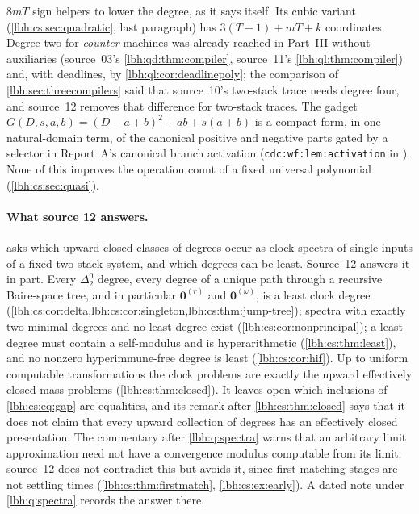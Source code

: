 \documentclass[11pt,letterpaper]{article}
\theoremstyle{definition}
\theoremstyle{remark}
\newcommand{\1}{\mathbf 1}
\begin{document}
$8mT$ sign helpers to lower the degree, as it says itself. Its cubic variant
(\cref{lbh:cs:sec:quadratic}, last paragraph) has $3(T+1)+mT+k$ coordinates. Degree two for
\emph{counter} machines was already reached in Part~III without auxiliaries (source~03's
\cref{lbh:qd:thm:compiler}, source~11's \cref{lbh:ql:thm:compiler}) and, with deadlines, by
\cref{lbh:ql:cor:deadlinepoly}; the comparison of \cref{lbh:sec:threecompilers} said that source~10's
two-stack trace needs degree four, and source~12 removes that difference for two-stack traces. The
gadget $G(D,s,a,b)=(D-a+b)^2+ab+s(a+b)$ is a compact form, in one natural-domain term, of the
canonical positive and negative parts gated by a selector in Report~A's canonical branch activation
(\texttt{cdc:wf:lem:activation} in ). None of this improves
the operation count of a fixed universal polynomial (\cref{lbh:cs:sec:quasi}).

\paragraph{What source 12 answers.}  asks which upward-closed classes of
degrees occur as clock spectra of single inputs of a fixed two-stack system, and which degrees can
be least. Source~12 answers it in part. Every $\Delta^0_2$ degree, every degree of a unique path
through a recursive Baire-space tree, and in particular $\mathbf0^{(r)}$ and $\mathbf0^{(\omega)}$,
is a least clock degree (\cref{lbh:cs:cor:delta,lbh:cs:cor:singleton,lbh:cs:thm:jump-tree});
spectra with exactly two minimal degrees and no least degree exist (\cref{lbh:cs:cor:nonprincipal});
a least degree must contain a self-modulus and is hyperarithmetic (\cref{lbh:cs:thm:least}), and no
nonzero hyperimmune-free degree is least (\cref{lbh:cs:cor:hif}). Up to uniform computable
transformations the clock problems are exactly the upward effectively closed mass problems
(\cref{lbh:cs:thm:closed}). It leaves open which inclusions of \eqref{lbh:cs:eq:gap} are equalities,
and its remark after \cref{lbh:cs:thm:closed} says that it does not claim that every upward
collection of degrees has an effectively closed presentation. The commentary after
\cref{lbh:q:spectra} warns that an arbitrary limit approximation need not have a convergence modulus
computable from its limit; source~12 does not contradict this but avoids it, since first matching
stages are not settling times (\cref{lbh:cs:thm:firstmatch}, \cref{lbh:cs:ex:early}). A dated note
under \cref{lbh:q:spectra} records the answer there.
\end{document}
